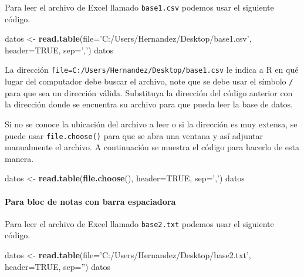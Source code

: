 \documentclass[10pt,]{krantz}
\makeatletter
\newenvironment{Shaded}{\begin{snugshade}}{\end{snugshade}}
\newcommand{\KeywordTok}[1]{\textcolor[rgb]{0.13,0.29,0.53}{\textbf{#1}}}
\newcommand{\DataTypeTok}[1]{\textcolor[rgb]{0.13,0.29,0.53}{#1}}
\newcommand{\StringTok}[1]{\textcolor[rgb]{0.31,0.60,0.02}{#1}}
\newcommand{\OtherTok}[1]{\textcolor[rgb]{0.56,0.35,0.01}{#1}}
\newcommand{\NormalTok}[1]{#1}
\let\oldparagraph\paragraph
\renewcommand{\paragraph}[1]{\oldparagraph{#1}\mbox{}}
\newenvironment{kframe}{%
\medskip{}
\setlength{\fboxsep}{.8em}
 \def\at@end@of@kframe{}%
 \ifinner\ifhmode%
  \def\at@end@of@kframe{\end{minipage}}%
  \begin{minipage}{\columnwidth}%
 \fi\fi%
 \def\FrameCommand##1{\hskip\@totalleftmargin \hskip-\fboxsep
 \colorbox{shadecolor}{##1}\hskip-\fboxsep
     \hskip-\linewidth \hskip-\@totalleftmargin \hskip\columnwidth}%
 \MakeFramed {\advance\hsize-\width
   \@totalleftmargin\z@ \linewidth\hsize
   \@setminipage}}%
 {\par\unskip\endMakeFramed%
 \at@end@of@kframe}
\renewenvironment{Shaded}{\begin{kframe}}{\end{kframe}}
\makeatother
\begin{document}
Para leer el archivo de Excel llamado \texttt{base1.csv} podemos usar el
siguiente código.

\begin{Shaded}
\begin{Highlighting}[]
\NormalTok{datos <-}\StringTok{ }\KeywordTok{read.table}\NormalTok{(}\DataTypeTok{file=}\StringTok{'C:/Users/Hernandez/Desktop/base1.csv'}\NormalTok{,}
                    \DataTypeTok{header=}\OtherTok{TRUE}\NormalTok{, }\DataTypeTok{sep=}\StringTok{','}\NormalTok{)}
\NormalTok{datos}
\end{Highlighting}
\end{Shaded}

La dirección
\texttt{file=\textquotesingle{}C:/Users/Hernandez/Desktop/base1.csv\textquotesingle{}}
le indica a R en qué lugar del computador debe buscar el archivo, note
que se debe usar el símbolo \texttt{/} para que sea un dirección válida.
Substituya la dirección del código anterior con la dirección donde se
encuentra su archivo para que pueda leer la base de datos.

Si no se conoce la ubicación del archivo a leer o si la dirección es muy
extensa, se puede usar \texttt{file.choose()} para que se abra una
ventana y así adjuntar manualmente el archivo. A continuación se muestra
el código para hacerlo de esta manera.

\begin{Shaded}
\begin{Highlighting}[]
\NormalTok{datos <-}\StringTok{ }\KeywordTok{read.table}\NormalTok{(}\KeywordTok{file.choose}\NormalTok{(), }\DataTypeTok{header=}\OtherTok{TRUE}\NormalTok{, }\DataTypeTok{sep=}\StringTok{','}\NormalTok{)}
\NormalTok{datos}
\end{Highlighting}
\end{Shaded}

\paragraph{Para bloc de notas con barra
espaciadora}\label{para-bloc-de-notas-con-barra-espaciadora}

Para leer el archivo de Excel llamado \texttt{base2.txt} podemos usar el
siguiente código.

\begin{Shaded}
\begin{Highlighting}[]
\NormalTok{datos <-}\StringTok{ }\KeywordTok{read.table}\NormalTok{(}\DataTypeTok{file=}\StringTok{'C:/Users/Hernandez/Desktop/base2.txt'}\NormalTok{,}
                    \DataTypeTok{header=}\OtherTok{TRUE}\NormalTok{, }\DataTypeTok{sep=}\StringTok{''}\NormalTok{)}
\NormalTok{datos}
\end{Highlighting}
\end{Shaded}
\end{document}

